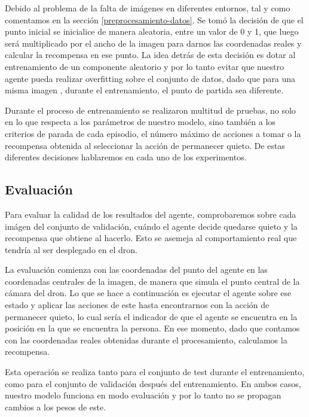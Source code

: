 Debido al problema de la falta de imágenes en diferentes entornos, tal y como comentamos en la sección \ref{preprocesamiento-datos}. Se tomó la decisión de que el punto inicial se inicialice de manera aleatoria, entre un valor de 0 y 1, que luego será multiplicado por el ancho de la imagen para darnos las coordenadas reales y calcular la recompensa en ese punto. La idea detrás de esta decisión es dotar al entrenamiento de un componente aleatorio y por lo tanto evitar que nuestro agente pueda realizar overfitting sobre el conjunto de datos, dado que para una misma imagen , durante el entrenamiento, el punto de partida sea diferente.
\medskip

Durante el proceso de entrenamiento se realizaron multitud de pruebas, no solo en lo que respecta a los parámetros de nuestro modelo, sino también a los criterios de parada de cada episodio, el número máximo de acciones a tomar o la recompensa obtenida al seleccionar la acción de permanecer quieto. De estas diferentes decisiones hablaremos en cada uno de los experimentos.
\medskip

\subsection{Evaluación}
\label{evaluacion}

Para evaluar la calidad de los resultados del agente, comprobaremos sobre cada imágen del conjunto de validación, cuándo el agente decide quedarse quieto y la recompensa que obtiene al hacerlo. Esto se asemeja al comportamiento real que tendría al ser desplegado en el dron.
\medskip

La evaluación comienza con las coordenadas del punto del agente en las coordenadas centrales de la imagen, de manera que simula el punto central de la cámara del dron. Lo que se hace a continuación es ejecutar el agente sobre ese estado y aplicar las acciones de este hasta encontrarnos con la acción de permanecer quieto, lo cual sería el indicador de que el agente se encuentra en la posición en la que se encuentra la persona. En ese momento, dado que contamos con las coordenadas reales obtenidas durante el procesamiento, calculamos la recompensa.
\medskip

Esta operación se realiza tanto para el conjunto de test durante el entrenamiento, como para el conjunto de validación después del entrenamiento. En ambos casos, nuestro modelo funciona en modo evaluación y por lo tanto no se propagan cambios a los pesos de este.
\medskip

